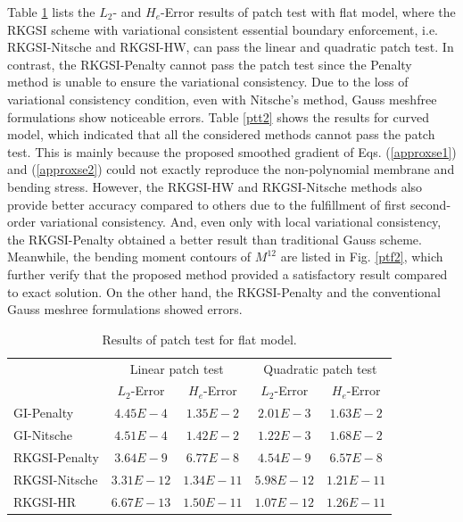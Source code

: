 Table \ref{ptt1} lists the $L_2$- and $H_e$-Error results of patch test with flat model, where the RKGSI scheme with variational consistent essential boundary enforcement, i.e. RKGSI-Nitsche and RKGSI-HW, can pass the linear and quadratic patch test. In contrast, the RKGSI-Penalty cannot pass the patch test since the Penalty method is unable to ensure the variational consistency. Due to the loss of variational consistency condition, even with Nitsche's method, Gauss meshfree formulations show noticeable errors. Table \ref{ptt2} shows the results for curved model, which indicated that all the considered methods cannot pass the patch test. This is mainly because the proposed smoothed gradient of Eqs. (\ref{approxse1}) and (\ref{approxse2}) could not exactly reproduce the non-polynomial membrane and bending stress. However, the RKGSI-HW and RKGSI-Nitsche methods also provide better accuracy compared to others due to the fulfillment of first second-order variational consistency. And, even only with local variational consistency, the RKGSI-Penalty obtained a better result than traditional Gauss scheme. Meanwhile, the bending moment contours of $M^{12}$ are listed in Fig. \ref{ptf2}, which further verify that the proposed method provided a satisfactory result compared to exact solution. On the other hand, the RKGSI-Penalty and the conventional Gauss meshree formulations showed errors.

\begin{table}[!ht]
\centering
\caption{Results of patch test for flat model.}\label{ptt1}
\begin{tabular}{lcccc}
\toprule
 & \multicolumn{2}{c}{Linear patch test} & \multicolumn{2}{c}{Quadratic patch test} \\ \cline{2-5}
 & $L_2$-Error & $H_e$-Error & $L_2$-Error & $H_e$-Error \\
    \midrule
    GI-Penalty & $4.45E-4$ & $1.35E-2$ & $2.01E-3$ & $1.63E-2$ \\
    GI-Nitsche & $4.51E-4$ & $1.42E-2$ & $1.22E-3$ & $1.68E-2$ \\
    RKGSI-Penalty & $3.64E-9$ & $6.77E-8$ & $4.54E-9$ & $6.57E-8$ \\
    RKGSI-Nitsche & $3.31E-12$ & $1.34E-11$ & $5.98E-12$ & $1.21E-11$ \\
    RKGSI-HR & $6.67E-13$ & $1.50E-11$ & $1.07E-12$ & $1.26E-11$ \\
    \bottomrule
\end{tabular}
\end{table}

